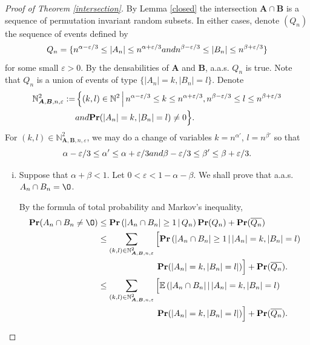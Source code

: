 \documentclass[10pt,a4paper]{amsart}
\def\Pr{\mathbf{Pr}}
\newcommand{\bs}{\boldsymbol}
\newcommand\esp[1]{\mathbb{E}\left( #1 \right)}
\newcommand{\vide}{\textup{\O}}
\begin{document}
\begin{proof}[Proof of Theorem \ref{intersection}]
    By Lemma \ref{closed} the intersection $\bs A\cap \bs B$ is a sequence of permutation invariant random subsets. In either cases, denote $(Q_n)$ the sequence of events defined by
    \[Q_n = \{n^{\alpha-\varepsilon/3}\leq|A_n|\leq n^{\alpha+\varepsilon/3}\textup{ and }n^{\beta-\varepsilon/3}\leq|B_n|\leq n^{\beta+\varepsilon/3}\}\] 
    for some small $\varepsilon>0$. By the densabilities of $\bs A$ and $\bs B$, a.a.s. $Q_n$ is true. Note that $Q_n$ is a union of events of type $\{|A_n|= k,|B_n| = l\}$. Denote 
    \[\begin{split}
        \mathbb{N}^2_{\bs A,\bs B, n, \varepsilon} := & \left\{ (k,l)\in \mathbb{N}^2 \,\middle|\, n^{\alpha-\varepsilon/3}\leq k \leq n^{\alpha+\varepsilon/3},n^{\beta-\varepsilon/3}\leq l \leq n^{\beta+\varepsilon/3} \right.\\
    & \textup{ and }\Pr(|A_n| = k,|B_n|=l)\neq 0 \Big\}.
    \end{split}\]
    For $(k,l)\in \mathbb{N}^2_{\bs A,\bs B, n, \varepsilon}$, we may do a change of variables $k = n^{\alpha'}$, $l = n^{\beta'}$ so that
        \[\alpha-\varepsilon/3\leq \alpha'\leq \alpha+\varepsilon/3\textup{ and }\beta-\varepsilon/3\leq \beta'\leq \beta+\varepsilon/3.\]
    
    \begin{enumerate}[(i)]
        \item Suppose that $\alpha +\beta<1$. Let $0<\varepsilon<1-\alpha-\beta$. We shall prove that a.a.s. $A_n\cap B_n=\vide$.
        
        By the formula of total probability and Markov's inequality,
        \[ \begin{split}
        \Pr(A_n\cap B_n\neq\vide) & \leq \Pr\left(|A_n \cap B_n|\geq 1\,\middle|\,Q_n\right)\Pr(Q_n)+\Pr(\overline{Q_n})\\
        & \leq \sum_{(k,l)\in\mathbb{N}^2_{\bs A,\bs B, n, \varepsilon}} \Big[ \Pr\left(|A_n \cap B_n|\geq 1\,\middle|\,|A_n|=k,|B_n| = l\right)\\
        &\qquad\qquad\qquad\quad\Pr(|A_n|=k,|B_n| = l|)\Big]+\Pr(\overline{Q_n}).\\        
        & \leq \sum_{(k,l)\in\mathbb{N}^2_{\bs A,\bs B, n, \varepsilon}} \Big[ \esp{|A_n \cap B_n|\,\middle|\,|A_n|=k,|B_n| = l}\\
        &\qquad\qquad\qquad\quad\Pr(|A_n|=k,|B_n| = l|)\Big]+\Pr(\overline{Q_n}).
        \end{split}\]
        

\end{enumerate}
\end{proof}
\end{document}
